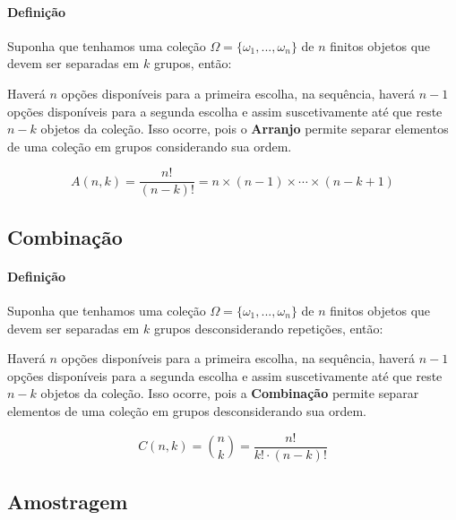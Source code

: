 \documentclass{article}
\begin{document}
            \paragraph{Definição}Suponha que tenhamos uma coleção $\Omega = \{ \omega_{1}, ..., \omega_{n} \}$ de $n$ finitos objetos que devem ser separadas em $k$ grupos, então:
                \begin{displayquote}[][]
                    Haverá $n$ opções disponíveis para a primeira escolha, na sequência, haverá $n-1$ opções disponíveis para a segunda escolha e assim suscetivamente até que reste $n-k$ objetos da coleção. Isso ocorre, pois o \textbf{Arranjo} permite separar elementos de uma coleção em grupos considerando sua ordem.
                \end{displayquote}
                \begin{equation}
                    \boxed{
                        A(n, k) = \frac{n!}{(n - k)!} = n \times (n - 1) \times \cdots \times (n - k + 1)
                    }
                \end{equation}

        \subsection{Combinação}
            \paragraph{Definição}Suponha que tenhamos uma coleção $\Omega = \{ \omega_{1}, ..., \omega_{n} \}$ de $n$ finitos objetos que devem ser separadas em $k$ grupos desconsiderando repetições, então:
                \begin{displayquote}[][]
                    Haverá $n$ opções disponíveis para a primeira escolha, na sequência, haverá $n-1$ opções disponíveis para a segunda escolha e assim suscetivamente até que reste $n-k$ objetos da coleção. Isso ocorre, pois a \textbf{Combinação} permite separar elementos de uma coleção em grupos desconsiderando sua ordem.
                \end{displayquote}
                \begin{equation}
                    \boxed{
                        C(n, k) = \binom{n}{k} = \frac{n!}{k! \cdot (n - k)!}
                    }
                \end{equation}

        \subsection{Amostragem}
\end{document}
